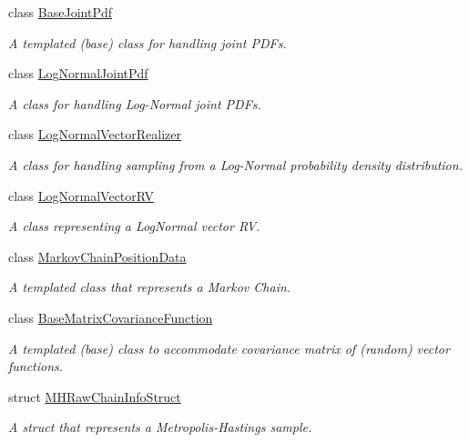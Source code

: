 \begin{DoxyCompactItemize}
class \hyperlink{class_q_u_e_s_o_1_1_base_joint_pdf}{Base\-Joint\-Pdf}
\begin{DoxyCompactList}\small\item\em A templated (base) class for handling joint P\-D\-Fs. \end{DoxyCompactList}\item 
class \hyperlink{class_q_u_e_s_o_1_1_log_normal_joint_pdf}{Log\-Normal\-Joint\-Pdf}
\begin{DoxyCompactList}\small\item\em A class for handling Log-\/\-Normal joint P\-D\-Fs. \end{DoxyCompactList}\item 
class \hyperlink{class_q_u_e_s_o_1_1_log_normal_vector_realizer}{Log\-Normal\-Vector\-Realizer}
\begin{DoxyCompactList}\small\item\em A class for handling sampling from a Log-\/\-Normal probability density distribution. \end{DoxyCompactList}\item 
class \hyperlink{class_q_u_e_s_o_1_1_log_normal_vector_r_v}{Log\-Normal\-Vector\-R\-V}
\begin{DoxyCompactList}\small\item\em A class representing a Log\-Normal vector R\-V. \end{DoxyCompactList}\item 
class \hyperlink{class_q_u_e_s_o_1_1_markov_chain_position_data}{Markov\-Chain\-Position\-Data}
\begin{DoxyCompactList}\small\item\em A templated class that represents a Markov Chain. \end{DoxyCompactList}\item 
class \hyperlink{class_q_u_e_s_o_1_1_base_matrix_covariance_function}{Base\-Matrix\-Covariance\-Function}
\begin{DoxyCompactList}\small\item\em A templated (base) class to accommodate covariance matrix of (random) vector functions. \end{DoxyCompactList}\item 
struct \hyperlink{struct_q_u_e_s_o_1_1_m_h_raw_chain_info_struct}{M\-H\-Raw\-Chain\-Info\-Struct}
\begin{DoxyCompactList}\small\item\em A struct that represents a Metropolis-\/\-Hastings sample. \end{DoxyCompactList}\item 

\end{DoxyCompactItemize}
